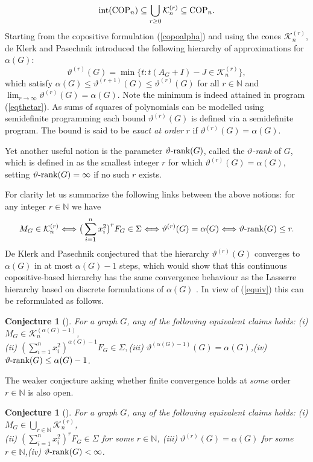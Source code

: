 \documentclass[11pt]{article}
\newcommand{\oN}{{\mathbb N}}
\newtheorem{conjecture}[theorem]{Conjecture}
\numberwithin{equation}{section}
\newcommand{\COP}{{\text{\rm COP}}}
\newcommand{\MK}{{\mathcal K}}
\newcommand{\rrank}{\vartheta\text{\rm -rank}}
\begin{document}
\begin{equation}\label{inclusion}
\text{int}(\COP_n) \subseteq \bigcup_{r\geq0}\MK_n^{(r)}\subseteq \COP_n.
\end{equation}
Starting from the copositive formulation (\ref{copoalpha})  and using the cones $\mathcal K^{(r)}_n$, de Klerk and Pasechnik \cite{dKP2002} introduced the following hierarchy of approximations for $\alpha(G)$:
\begin{equation}\label{eqthetar}
\vartheta^{(r)}(G)=\min\{t : t(A_G+I)-J \in \MK_n^{(r)}\},
\end{equation} 
which satisfy  $\alpha(G)\leq \vartheta^{(r+1)}(G) \leq \vartheta^{(r)}(G)$ for all $r\in \mathbb{N}$ and $\lim_{r\to \infty}\vartheta^{(r)}(G)=\alpha(G)$. Note  the minimum is indeed attained in program (\ref{eqthetar}). As sums of squares of polynomials can be modelled using semidefinite programming each bound $\vartheta^{(r)}(G)$ is defined via a semidefinite program. The bound is said to be {\em exact at order} $r$ if $\vartheta^{(r)}(G)=\alpha(G)$. 


Yet another useful notion is the parameter $\rrank(G)$, called the {\em $\vartheta$-rank} of $G$, which is defined in \cite{LV2021} as the smallest integer $r$ for which $\vartheta^{(r)}(G)=\alpha(G)$, setting $\rrank(G)=\infty$ if no such $r$ exists.

For clarity let us  summarize  the following links %
between the above notions: for any integer $r\in \oN$ we have
\begin{equation}\label{equiv}
M_G\in \mathcal K^{(r)}_n \Longleftrightarrow \big(\sum_{i=1} ^n x_i^2\big)^r F_G \in \Sigma\Longleftrightarrow \vartheta^{(r)}(G)=\alpha(G)\Longleftrightarrow \rrank(G)\le r.
\end{equation}
De Klerk and Pasechnik \cite{dKP2002} conjectured that the hierarchy $\vartheta^{(r)}(G)$ converges to $\alpha(G)$ in at most $\alpha(G)-1$ steps, which would show that this continuous copositive-based hierarchy has the same convergence behaviour as the Lasserre hierarchy based on discrete formulations of $\alpha(G)$ \cite{Lasserre2001b,Laurent2003}.
 In view of (\ref{equiv}) this can be reformulated as follows.

\begin{conjecture}[\cite{dKP2002}] \label{conj1}
For a graph  $G$, any of the following equivalent claims holds: (i) $M_G\in \MK_n^{(\alpha(G)-1)}$, \\ (ii) $(\sum_{i=1}^n x_i^2)^{\alpha(G)-1}F_G\in \Sigma,$\quad  (iii)  $\vartheta^{(\alpha(G)-1)}(G)=\alpha(G)$,\quad (iv) $\rrank(G)\leq \alpha(G)-1$.
\end{conjecture}
The weaker conjecture asking  whether finite convergence holds at {\em some} order $r\in \oN$ is also open.
\begin{conjecture}[\cite{LV2021}]\label{conj2}
For a graph  $G$, any of the following equivalent claims holds: (i) $M_G\in\bigcup_{r\in \oN}\mathcal K^{(r)}_n$,
\\ (ii)  $(\sum_{i=1}^n x_i^2)^{r}F_G\in \Sigma$ for some $r\in\oN$,\quad
(iii) $\vartheta^{(r)}(G)=\alpha(G)$ for some $r\in\oN$,\quad (iv)   $\rrank(G)< \infty$.
  \end{conjecture}
\end{document}
